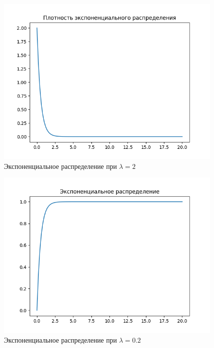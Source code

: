 \documentclass[a4paper, 14pt]{article}
\begin{document}
\begin{figure}[H]
    \includegraphics[scale=0.8]{2_exponential_density.png}
    \caption{Экспоненциальное распределение при $\lambda=2$}
\end{figure}

\begin{figure}[H]
    \includegraphics[scale=0.8]{2_exponential.png}
    \caption{Экспоненциальное распределение при $\lambda=0.2$}
\end{figure}
\end{document}
